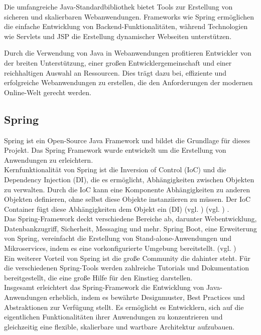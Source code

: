 \documentclass[fontsize=12pt,openright,oneside,paper=a4,BCOR=1cm]{scrbook}
\begin{document}
Die umfangreiche Java-Standardbibliothek bietet Tools zur Erstellung von sicheren und skalierbaren Webanwendungen. Frameworks wie Spring ermöglichen die einfache Entwicklung von Backend-Funktionalitäten, während Technologien wie Servlets und JSP die Erstellung dynamischer Webseiten unterstützen.

Durch die Verwendung von Java in Webanwendungen profitieren Entwickler von der breiten Unterstützung, einer großen Entwicklergemeinschaft und einer reichhaltigen Auswahl an Ressourcen. Dies trägt dazu bei, effiziente und erfolgreiche Webanwendungen zu erstellen, die den Anforderungen der modernen Online-Welt gerecht werden.

\subsection{Spring}

Spring ist ein Open-Source Java Framework und bildet die Grundlage für dieses Projekt. Das Spring Framework wurde entwickelt um die Erstellung von Anwendungen zu erleichtern. \\
Kernfunktionalität von Spring ist die Inversion of Control (IoC) und die Dependency Injection (DI), die es ermöglicht, Abhängigkeiten zwischen Objekten zu verwalten. Durch die IoC kann eine Komponente Abhängigkeiten zu anderen Objekten definieren, ohne selbst diese Objekte instanziieren zu müssen. Der IoC Container fügt diese Abhängigkeiten dem Objekt ein (DI) (vgl. \cite{springioc}) (vgl. \cite{springiocMisc}) . \\
Das Spring-Framework deckt verschiedene Bereiche ab, darunter Webentwicklung, Datenbankzugriff, Sicherheit, Messaging und mehr. Spring Boot, eine Erweiterung von Spring, vereinfacht die Erstellung von Stand-alone-Anwendungen und Mikroservices, indem es eine vorkonfigurierte Umgebung bereitstellt. (vgl. \cite{springboot}) \\
Ein weiterer Vorteil von Spring ist die große Community die dahinter steht. Für die verschiedenen Spring-Tools werden zahlreiche Tutorials und Dokumentation bereitgestellt, die eine große Hilfe für den Einstieg darstellen. \\

Insgesamt erleichtert das Spring-Framework die Entwicklung von Java-Anwendungen erheblich, indem es bewährte Designmuster, Best Practices und Abstraktionen zur Verfügung stellt. Es ermöglicht es Entwicklern, sich auf die eigentlichen Funktionalitäten ihrer Anwendungen zu konzentrieren und gleichzeitig eine flexible, skalierbare und wartbare Architektur aufzubauen.
\end{document}
